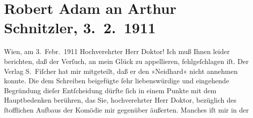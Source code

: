 

         
         \renewcommand{\erwaehntePersonen}{Personen: Julius Bittner}
         \renewcommand{\erwaehnteInstitutionen}{Institutionen: Der Merker, S. Fischer Verlag}
         \renewcommand{\erwaehnteOrte}{Orte: Wien}
         \renewcommand{\erwaehnteWerke}{Werke: Die Geschichte des Alî ibn Bekkâr mit Schams an-Nahâr, Neidhard}
               \section[Robert Adam an Arthur Schnitzler, 3. 2. 1911]{ Robert Adam an Arthur Schnitzler, 3. 2. 1911}\nopagebreak{}\rehead{ }\begin{ledgroupsized}[t]{13cm}\normalsize\beginnumbering \toendnotes[C]{\smallbreak\pagebreak[2]} 
\toendnotes[C]{\smallbreak}\pstart
           \raggedleft{}{\pb}Wien, am 3. Febr. 1911\pend
           \pstart{}Hochverehrter Herr Doktor!\pend\pstart
           Ich muß Ihnen leider berichten, daß der Verſuch, an mein Glück zu appellieren,
               fehlgeſchlagen iſt. Der Verlag S. Fiſcher hat mir
               mitgeteilt, daß er den »Neidhard« nicht annehmen
               konnte. Die dem Schreiben beigefügte ſehr liebenswürdige und eingehende Begründung
               dieſer Entſcheidung dürfte ſich in einem Punkte mit dem Hauptbedenken berühren, das
               Sie, hochverehrter Herr Doktor, {\pb}bezüglich des
               ſtofflichen Aufbaus der Komödie mir gegenüber äußerten. Manches iſt mir in der

\end{ledgroupsized}
